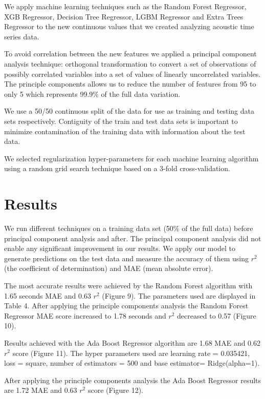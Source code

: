 \documentclass[]{llncs} %
\begin{document}
We apply machine learning techniques such as the Random Forest Regressor, XGB Regressor,  Decision Tree Regressor, LGBM Regressor and Extra Trees Regressor to the new continuous values that we created analyzing acoustic time series data. \par
To avoid correlation between the new features we applied a principal component analysis technique: orthogonal transformation to convert a set of observations of possibly correlated variables into a set of values of linearly uncorrelated variables. The principle components allows us to reduce the number of features from 95 to only 5 which represents 99.9\% of the full data variation. \par
We use a 50/50 continuous split of the data for use as training and testing data sets respectively. Contiguity of the train and test data sets is important to minimize contamination of the training data with information about the test data. \par
We selected regularization hyper-parameters for each machine learning algorithm using a random grid search technique based on a 3-fold cross-validation.
\section{Results}
We run different techniques on a training data set (50\% of the full data) before principal component analysis and after. The principal component analysis did not enable any significant improvement in our results. We apply our model to generate predictions on the test data  and measure the accuracy of them using $r^2$ (the coefficient of determination) and MAE (mean absolute error). \par 

The most accurate results were achieved by the Random Forest algorithm with 1.65 seconds MAE and 0.63 $r^2$ (Figure 9). The parameters used are displayed in Table 4. %
After applying the principle components analysis the Random Forest Regressor MAE score increased to 1.78 seconds and $r^2$ decreased to 0.57 (Figure 10).\par 
Results achieved with the Ada Boost Regressor algorithm are 1.68 MAE and 0.62 $r^2$ score (Figure 11). The hyper parameters used are learning rate = 0.035421, loss = square, number of estimators = 500 and base estimator= Ridge(alpha=1). \par 
After applying the principle components analysis the Ada Boost Regressor results are 1.72 MAE and 0.63 $r^2$ score (Figure 12).\par 
\end{document}
